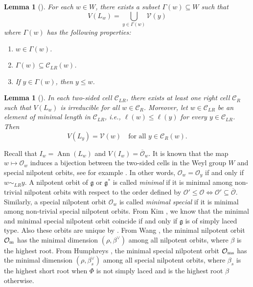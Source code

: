 \documentclass[11pt, reqno]{amsart}
\renewcommand{\subset}{\subseteq}
\newcommand{\Ann}{\operatorname{Ann}}
\newtheorem{lem}[Thm]{Lemma}
\theoremstyle{definition}
\numberwithin{equation}{section}
\begin{document}
\begin{lem}[{\cite[Thm. 2.1]{Mel93}}]\label{gamma-w}
    For each $w\in W$, there exists a subset $\Gamma(w)\subset W$ such that
    $$V(L_w)=\bigcup\limits_{y\in \Gamma(w)}\mathcal{V}(y)$$
    where $\Gamma(w)$ has the following properties:
    \begin{enumerate}
        \item $w\in \Gamma(w)$.
        \item $\Gamma(w)\subset \mathcal{C}_{LR}(w)$.
        \item If $y\in \Gamma(w)$, then $y\leq w$.
    \end{enumerate}
\end{lem}
\begin{lem}[{\cite[Prop. 4.1]{Mel93}}]\label{min-length-w}
In each two-sided cell $\mathcal{C}_{LR}$, there exists at least one right cell $\mathcal{C}_R$ such that $V(L_w)$ is irreducible for all $w \in \mathcal{C}_R$. Moreover, let $w \in \mathcal{C}_{LR}$ be an element of minimal length in $\mathcal{C}_{LR}$, i.e., $\ell(w) \le \ell(y)$ for every $y \in \mathcal{C}_{LR}$. Then
\[
V(L_y) = \mathcal{V}(w) \quad \text{for all } y \in \mathcal{C}_R(w).
\]
\end{lem}

Recall that $I_w=\Ann(L_w)$ and  $V(I_w)=\overline{\mathcal{O}}_w$. It is known that the map $w\mapsto \mathcal{O}_w$  induces a bijection between the two-sided cells in the Weyl group $W$ and special nilpotent orbits, see for example \cite{BV82, BoB1, Ta}. In other words, $\mathcal{O}_w=\mathcal{O}_y$ if and only if $w\sim_{LR}y$. A nilpotent orbit of $\mathfrak{g}$ or $\mathfrak{g}^*$ is called {\it minimal} if it is minimal among non-trivial nilpotent orbits with respect to the order defined by $\mathcal{O}' \leq \mathcal{O} \Leftrightarrow \mathcal{O}' \subset \overline{\mathcal{O}}$. Similarly, 
a special nilpotent orbit $\mathcal{O}_w$ is called  {\it minimal special}  if it is minimal among non-trivial special nilpotent orbits. From Kim \cite{Kim19}, we know that the minimal and  minimal special nilpotent orbit coincide if and only if $\mathfrak{g}$ is of simply laced type. Also these orbits are unique by \cite[\S 2.8]{Kim19}. From Wang \cite{Wang}, the minimal nilpotent orbit $\mathcal{O}_{\rm m}$ has the minimal dimension $(\rho, \beta^{\vee})$ among all nilpotent orbits, where $\beta$ is the  highest root.  From Humphreys \cite[Prop. 5]{Hum16}, the minimal special nilpotent orbit $\mathcal{O}_{\rm ms}$ has the minimal dimension $(\rho, \beta_s^{\vee})$ among all special nilpotent orbits, where $\beta_s$ is the highest short root  when $\Phi$ is not simply laced and is the highest root $\beta$ otherwise.
\end{document}
